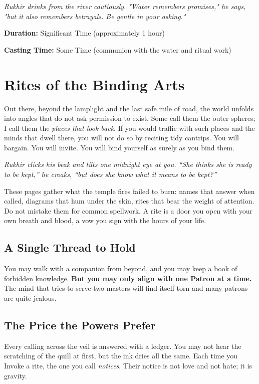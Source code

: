 \documentclass[12pt,twoside]{book}
\newcommand{\shadow}[1]{\textit{#1}}
\begin{document}
	\shadow{Rukhir drinks from the river cautiously. "Water remembers promises," he says, "but it also remembers betrayals. Be gentle in your asking."}

	\textbf{Duration:} Significant Time (approximately 1 hour)

	\textbf{Casting Time:} Some Time (communion with the water and ritual work)

	\chapter{Rites of the Binding Arts}
	\label{chap:outer-rites}

	\lettrine[lines=3]{O}{}ut there, beyond the lamplight and the last safe mile of road, the world unfolds into angles that do not ask permission to exist. Some call them the outer spheres; I call them the \emph{places that look back}. If you would traffic with such places and the minds that dwell there, you will not do so by reciting tidy cantrips. You will bargain. You will invite. You will bind yourself as surely as you bind them.

	\shadow{Rukhir clicks his beak and tilts one midnight eye at you. ``She thinks she is ready to be \emph{kept},'' he croaks, ``but does she know what it means to be \emph{kept}?''}

	These pages gather what the temple fires failed to burn: names that answer when called, diagrams that hum under the skin, rites that bear the weight of attention. Do not mistake them for common spellwork. A rite is a door you open with your own breath and blood, a vow you sign with the hours of your life.

	\section*{A Single Thread to Hold}
	You may walk with a companion from beyond, and you may keep a book of forbidden knowledge. \textbf{But you may only align with one Patron at a time.} The mind that tries to serve two masters will find itself torn and many patrons are quite jealous.

	\section*{The Price the Powers Prefer}
	Every calling across the veil is answered with a ledger. You may not hear the scratching of the quill at first, but the ink dries all the same. Each time you Invoke a rite, the one you call \emph{notices}. Their notice is not love and not hate; it is gravity.
\end{document}
